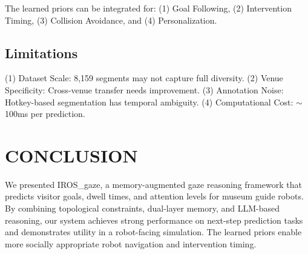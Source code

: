 \documentclass{letterpaper,article}
\begin{document}
The learned priors can be integrated for: (1) Goal Following, (2) Intervention Timing, (3) Collision Avoidance, and (4) Personalization.

\subsection{Limitations}

(1) Dataset Scale: 8,159 segments may not capture full diversity. (2) Venue Specificity: Cross-venue transfer needs improvement. (3) Annotation Noise: Hotkey-based segmentation has temporal ambiguity. (4) Computational Cost: $\sim$100ms per prediction.

\section{CONCLUSION}

We presented IROS\_gaze, a memory-augmented gaze reasoning framework that predicts visitor goals, dwell times, and attention levels for museum guide robots. By combining topological constraints, dual-layer memory, and LLM-based reasoning, our system achieves strong performance on next-step prediction tasks and demonstrates utility in a robot-facing simulation. The learned priors enable more socially appropriate robot navigation and intervention timing.
\end{document}
